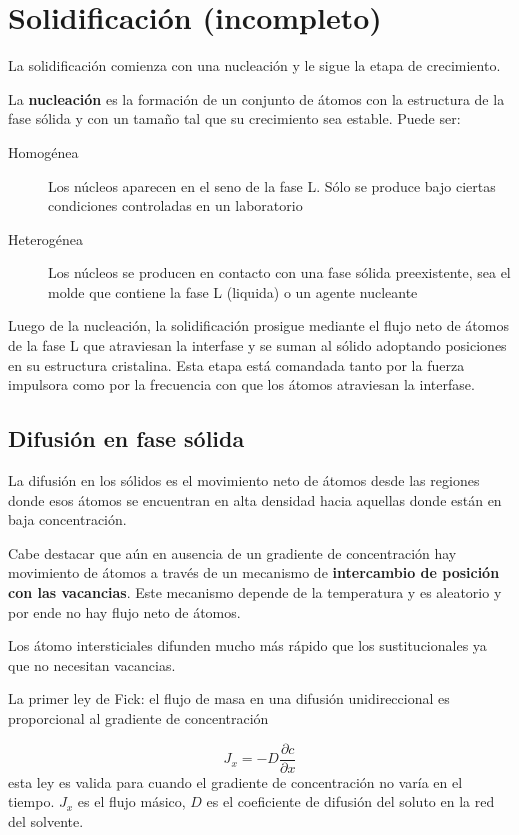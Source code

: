 \section{Solidificación (incompleto)}

La solidificación comienza con una nucleación y le sigue la etapa de crecimiento.

La \textbf{nucleación} es la formación de un conjunto de átomos con la estructura de la fase sólida y con un tamaño tal que su crecimiento sea estable. Puede ser:

\begin{description}
	\item[Homogénea] Los núcleos aparecen en el seno de la fase L. Sólo se produce bajo ciertas condiciones controladas en un laboratorio
	\item[Heterogénea] Los núcleos se producen en contacto con una fase sólida preexistente, sea el molde que contiene la fase L (liquida) o un agente nucleante
\end{description}


Luego de la nucleación, la solidificación prosigue mediante el flujo neto de átomos de la fase L que atraviesan la interfase y se suman al sólido adoptando posiciones en su estructura cristalina. Esta etapa está comandada tanto por la fuerza impulsora como por la frecuencia con que los átomos atraviesan la interfase.

\subsection{Difusión en fase sólida}

La difusión en los sólidos es el movimiento neto de átomos desde las regiones donde esos átomos se encuentran en alta densidad hacia aquellas donde están en baja concentración. 

Cabe destacar que aún en ausencia de un gradiente de concentración hay movimiento de átomos a través de un mecanismo de \textbf{intercambio de posición con las vacancias}. Este mecanismo depende de la temperatura y es aleatorio y por ende no hay flujo neto de átomos.

Los átomo intersticiales difunden mucho más rápido que los sustitucionales ya que no necesitan vacancias.


La primer ley de Fick: el flujo de masa en una difusión unidireccional es proporcional al gradiente de concentración

\begin{equation}
	J_x = - D \frac{\partial c}{\partial x}
\end{equation}
esta ley es valida para cuando el gradiente de concentración no varía en el tiempo. $J_x$ es el flujo másico, $D$ es el coeficiente de difusión del soluto en la red del solvente.


